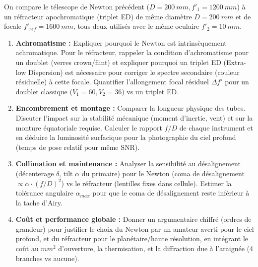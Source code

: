 \documentclass[11pt]{article}
\begin{document}
\begin{exercice}
On compare le télescope de Newton précédent ($D=\SI{200}{mm}, f'_1=\SI{1200}{mm}$) à un réfracteur apochromatique (triplet ED) de même diamètre $D=\SI{200}{mm}$ et de focale $f'_{ref}=\SI{1600}{mm}$, tous deux utilisés avec le même oculaire $f'_2=\SI{10}{mm}$.
\begin{enumerate}
    \item \textbf{Achromatisme :} Expliquer pourquoi le Newton est intrinsèquement achromatique. Pour le réfracteur, rappeler la condition d'achromatisme pour un doublet (verres crown/flint) et expliquer pourquoi un triplet ED (Extra-low Dispersion) est nécessaire pour corriger le spectre secondaire (couleur résiduelle) à cette focale. Quantifier l'allongement focal résiduel $\Delta f'$ pour un doublet classique ($V_1=60, V_2=36$) vs un triplet ED.
    \item \textbf{Encombrement et montage :} Comparer la longueur physique des tubes. Discuter l'impact sur la stabilité mécanique (moment d'inertie, vent) et sur la monture équatoriale requise. Calculer le rapport $f/D$ de chaque instrument et en déduire la luminosité surfacique pour la photographie du ciel profond (temps de pose relatif pour même SNR).
    \item \textbf{Collimation et maintenance :} Analyser la sensibilité au désalignement (décenterage $\delta$, tilt $\alpha$ du primaire) pour le Newton (coma de désalignement $\propto \alpha \cdot (f/D)^2$) vs le réfracteur (lentilles fixes dans cellule). Estimer la tolérance angulaire $\alpha_{max}$ pour que le coma de désalignement reste inférieur à la tache d'Airy.
    \item \textbf{Coût et performance globale :} Donner un argumentaire chiffré (ordres de grandeur) pour justifier le choix du Newton par un amateur averti pour le ciel profond, et du réfracteur pour le planétaire/haute résolution, en intégrant le coût au $mm^2$ d'ouverture, la thermisation, et la diffraction due à l'araignée (4 branches vs aucune).
\end{enumerate}
\end{exercice}
\end{document}
